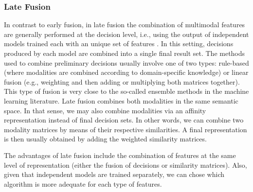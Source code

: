 \documentclass{llncs}
\begin{document}
%
\subsubsection{Late Fusion}
In contrast to early fusion, in late fusion the combination of multimodal features are generally performed at the decision level, i.e., using the output of independent models trained  each with an unique set of features \cite{ClinchantAC11}. In this setting,  decisions produced by each model are combined into a single final result set.
%
The methods used to combine preliminary decisions usually involve one of two types: rule-based (where modalities are combined according to domain-specific knowledge) or linear fusion (e.g., weighting and then adding or multiplying both matrices together). This type of fusion is very close to the so-called ensemble methods in the machine learning literature.
%
Late fusion combines both modalities in the same semantic space. In that sense,  we may also combine modalities via an affinity representation instead of final decision sets. In other words, we can combine two modality matrices by means of their respective similarities. A final representation is then usually obtained by adding the weighted similarity matrices.
%

The advantages of late fusion include the combination of features at the same level of representation (either the fusion of decisions or similarity matrices). Also, given that independent models are trained separately, we can chose which algorithm is more adequate for each type of
features.

\end{document}
